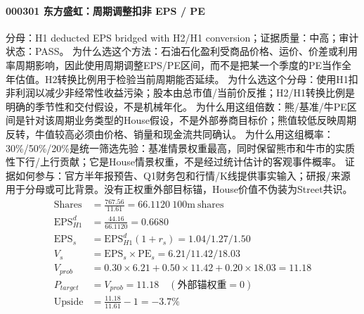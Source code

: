 \paragraph{000301 东方盛虹：周期调整扣非 EPS / PE}
分母：H1 deducted EPS bridged with H2/H1 conversion；证据质量：中高；审计状态：PASS。
为什么选这个方法：石油石化盈利受商品价格、运价、价差或利用率周期影响，因此使用周期调整EPS/PE区间，而不是把某一个季度的PE当作全年估值。H2转换比例用于检验当前周期能否延续。
为什么选这个分母：使用H1扣非利润以减少非经常性收益污染；股本由总市值/当前价反推；H2/H1转换比例是明确的季节性和交付假设，不是机械年化。
为什么用这组倍数：熊/基准/牛PE区间是针对该周期业务类型的House假设，不是外部券商目标价；熊值较低反映周期反转，牛值较高必须由价格、销量和现金流共同确认。
为什么用这组概率：30\%/50\%/20\%是统一筛选先验：基准情景权重最高，同时保留熊市和牛市的实质性下行/上行贡献；它是House情景权重，不是经过统计估计的客观事件概率。
证据如何参与：官方半年报预告、Q1财务包和行情/K线提供事实输入；研报/来源用于分母或可比背景。没有正权重外部目标锚，House价值不伪装为Street共识。
\begin{align*}
\mathrm{Shares} &= \frac{767.56}{11.61}=66.1120\ \mathrm{100m\ shares}\\
\mathrm{EPS}_{H1}^d &= \frac{44.16}{66.1120}=0.6680\\
\mathrm{EPS}_s &= \mathrm{EPS}_{H1}^d(1+r_s)=1.04/1.27/1.50\\
V_s &= \mathrm{EPS}_s\times \mathrm{PE}_s=6.21/11.42/18.03\\
V_{prob} &= 0.30\times 6.21+0.50\times 11.42+0.20\times 18.03=11.18\\
P_{target} &= V_{prob}=11.18\quad(\text{外部锚权重}=0)\\
\mathrm{Upside} &= \frac{11.18}{11.61}-1=-3.7\%\\
\end{align*}

